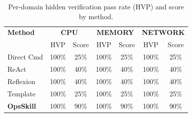 \begin{table}[t]
\centering
\caption{Per-domain hidden verification pass rate (HVP) and score by method.}
\label{tab:domain-breakdown}
\small
\begin{tabular}{lcccccc}
\toprule
\textbf{Method} & \multicolumn{2}{c}{\textbf{CPU}} & \multicolumn{2}{c}{\textbf{MEMORY}} & \multicolumn{2}{c}{\textbf{NETWORK}} \\
 & HVP & Score & HVP & Score & HVP & Score \\
\midrule
Direct Cmd & 100\% & 25\% & 100\% & 25\% & 100\% & 25\% \\
ReAct & 100\% & 40\% & 100\% & 40\% & 100\% & 40\% \\
Reflexion & 100\% & 40\% & 100\% & 40\% & 100\% & 40\% \\
Template & 100\% & 25\% & 100\% & 25\% & 100\% & 25\% \\
\textbf{OpsSkill} & 100\% & 90\% & 100\% & 90\% & 100\% & 90\% \\
\bottomrule
\end{tabular}
\end{table}